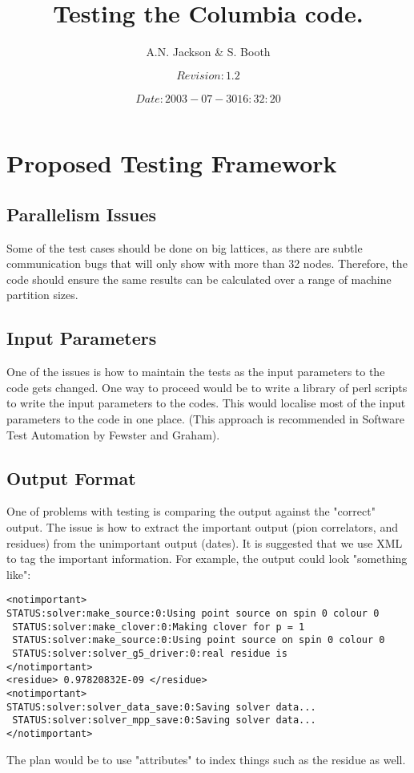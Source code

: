 \documentclass[12pt]{article}
\title{Testing the Columbia code.}
\author{A.N. Jackson \& S. Booth}
\date{\mbox{\small $$Revision: 1.2 $$  $$Date: 2003-07-30 16:32:20 $$}}
\begin{document}
\maketitle

\tableofcontents
\newpage

\section{Proposed Testing Framework}

\subsection{Parallelism Issues}
Some of the test cases should be done on big lattices, as there are subtle communication bugs that will only show with more than 32 nodes.  Therefore, the code should ensure the same results can be calculated over a range of machine partition sizes.

\subsection{Input Parameters}
One of the issues is how to maintain the tests 
as the input parameters to the code gets changed. One way to
proceed would be to write a library of perl scripts to write 
the input parameters to the codes. This would localise most of the 
input parameters to the code in one place. (This approach is 
recommended in Software Test Automation by Fewster and 
Graham).


\subsection{Output Format}
One of problems with testing is comparing the output against the "correct" output. The issue is how to extract the important output (pion correlators, and residues) from the unimportant output (dates).  It is suggested that we use XML to tag the important information. 
For example, the output could look "something like":
\begin{verbatim}
<notimportant>
STATUS:solver:make_source:0:Using point source on spin 0 colour 0
 STATUS:solver:make_clover:0:Making clover for p = 1
 STATUS:solver:make_source:0:Using point source on spin 0 colour 0
 STATUS:solver:solver_g5_driver:0:real residue is  
</notimportant>
<residue> 0.97820832E-09 </residue>
<notimportant>
STATUS:solver:solver_data_save:0:Saving solver data...
 STATUS:solver:solver_mpp_save:0:Saving solver data...
</notimportant>
\end{verbatim}
The plan would be to use "attributes" to index
things such as the residue as well.
\end{document}
